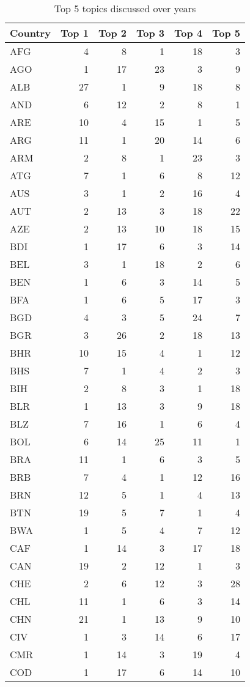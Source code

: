 \begin{table}
    \centering
    \caption{Top 5 topics discussed over years}
    \label{tab:top 5 topics all1}
    \begin{tabular}{lrrrrr}
    \toprule
    Country &     Top 1 &     Top 2 &     Top 3 &     Top 4 &     Top 5 \\
    \midrule
    AFG  & 4 & 8 & 1 & 18 & 3\\
    AGO  & 1 & 17 & 23 & 3 & 9\\
    ALB  & 27 & 1 & 9 & 18 & 8\\
    AND  & 6 & 12 & 2 & 8 & 1\\
    ARE  & 10 & 4 & 15 & 1 & 5\\
    ARG  & 11 & 1 & 20 & 14 & 6\\
    ARM  & 2 & 8 & 1 & 23 & 3\\
    ATG  & 7 & 1 & 6 & 8 & 12\\
    AUS  & 3 & 1 & 2 & 16 & 4\\
    AUT  & 2 & 13 & 3 & 18 & 22\\
    AZE  & 2 & 13 & 10 & 18 & 15\\
    BDI  & 1 & 17 & 6 & 3 & 14\\
    BEL  & 3 & 1 & 18 & 2 & 6\\
    BEN  & 1 & 6 & 3 & 14 & 5\\
    BFA  & 1 & 6 & 5 & 17 & 3\\
    BGD  & 4 & 3 & 5 & 24 & 7\\
    BGR  & 3 & 26 & 2 & 18 & 13\\
    BHR  & 10 & 15 & 4 & 1 & 12\\
    BHS  & 7 & 1 & 4 & 2 & 3\\
    BIH  & 2 & 8 & 3 & 1 & 18\\
    BLR  & 1 & 13 & 3 & 9 & 18\\
    BLZ  & 7 & 16 & 1 & 6 & 4\\
    BOL  & 6 & 14 & 25 & 11 & 1\\
    BRA  & 11 & 1 & 6 & 3 & 5\\
    BRB  & 7 & 4 & 1 & 12 & 16\\
    BRN  & 12 & 5 & 1 & 4 & 13\\
    BTN  & 19 & 5 & 7 & 1 & 4\\
    BWA  & 1 & 5 & 4 & 7 & 12\\
    CAF  & 1 & 14 & 3 & 17 & 18\\
    CAN  & 19 & 2 & 12 & 1 & 3\\
    CHE  & 2 & 6 & 12 & 3 & 28\\
    CHL  & 11 & 1 & 6 & 3 & 14\\
    CHN  & 21 & 1 & 13 & 9 & 10\\
    CIV  & 1 & 3 & 14 & 6 & 17\\
    CMR  & 1 & 14 & 3 & 19 & 4\\
    COD  & 1 & 17 & 6 & 14 & 10\\
    \bottomrule
    \end{tabular}\end{table}
    
